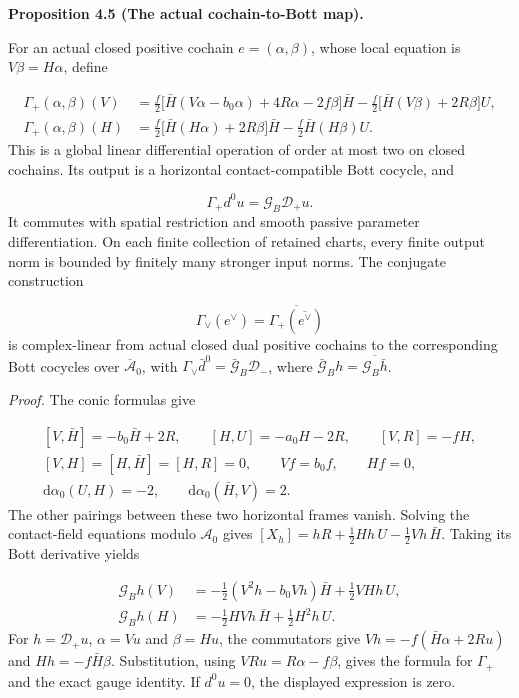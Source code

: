 \documentclass[
  english,
  11pt,
  reqno]{amsart}
\makeatletter
\newcommand{\pandocstatementheading}[1]{%
  \par\addpenalty{\@beginparpenalty}%
  \addvspace{.5\baselineskip plus .2\baselineskip minus .2\baselineskip}%
  {\normalfont\bfseries #1\par}%
  \nobreak\@afterindenttrue\@afterheading
}
\makeatother
\begin{document}
\pandocstatementheading{\leavevmode{}\label{prop:online-actual-contact-cochain-map}Proposition 4.5 (The actual cochain-to-Bott map).}

For an actual closed positive cochain \(e=(\alpha,\beta)\), whose local
equation is \(V\beta=H\alpha\), define

\label{eq:online-contact-positive-cochain-map} \[
\begin{aligned}
\Gamma_+(\alpha,\beta)(V)
&=\frac f2\bigl[\bar H(V\alpha-b_0\alpha)+4R\alpha-2f\beta\bigr]\bar H
 -\frac f2\bigl[\bar H(V\beta)+2R\beta\bigr]U,\\
\Gamma_+(\alpha,\beta)(H)
&=\frac f2\bigl[\bar H(H\alpha)+2R\beta\bigr]\bar H
 -\frac f2\bar H(H\beta)U.
\end{aligned}
\] This is a global linear differential operation of order at most two
on closed cochains. Its output is a horizontal contact-compatible Bott
cocycle, and

\label{eq:online-contact-cochain-gauge-identity} \[
\Gamma_+d^0u=\mathcal G_B\mathcal D_+u.
\] It commutes with spatial restriction and smooth passive parameter
differentiation. On each finite collection of retained charts, every
finite output norm is bounded by finitely many stronger input norms. The
conjugate construction

\label{eq:online-contact-dual-cochain-map} \[
\Gamma_\vee(e^\vee)=\overline{\Gamma_+(\overline{e^\vee})}
\] is complex-linear from actual closed dual positive cochains to the
corresponding Bott cocycles over \(\overline{\mathcal A}_0\), with
\(\Gamma_\vee\bar d^0=\bar{\mathcal G}_B\mathcal D_-\), where
\(\bar{\mathcal G}_Bh=\overline{\mathcal G_B\bar h}\).

\emph{Proof.} The conic formulas give

\label{eq:online-contact-response-commutators} \[
\begin{gathered}
[V,\bar H]=-b_0\bar H+2R,\qquad
[H,U]=-a_0H-2R,\qquad [V,R]=-fH,\\
[V,H]=[H,\bar H]=[H,R]=0,\qquad
Vf=b_0f,\qquad Hf=0,\\
\mathrm d\alpha_0(U,H)=-2,\qquad
\mathrm d\alpha_0(\bar H,V)=2.
\end{gathered}
\] The other pairings between these two horizontal frames vanish.
Solving the contact-field equations modulo \(\mathcal A_0\) gives
\([X_h]=hR+\tfrac12Hh\,U-\tfrac12Vh\,\bar H\). Taking its Bott
derivative yields

\label{eq:online-contact-gauge-components} \[
\begin{aligned}
\mathcal G_Bh(V)
&=-\frac12(V^2h-b_0Vh)\bar H+\frac12VHh\,U,\\
\mathcal G_Bh(H)
&=-\frac12HVh\,\bar H+\frac12H^2h\,U.
\end{aligned}
\] For \(h=\mathcal D_+u\), \(\alpha=Vu\) and \(\beta=Hu\), the
commutators give \(Vh=-f(\bar H\alpha+2Ru)\) and \(Hh=-f\bar H\beta\).
Substitution, using \(VRu=R\alpha-f\beta\), gives the formula for
\(\Gamma_+\) and the exact gauge identity. If \(d^0u=0\), the displayed
expression is zero.
\end{document}
